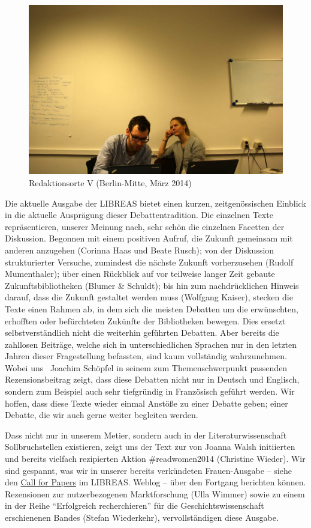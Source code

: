 \documentclass[a4paper,
fontsize=11pt,
oneside,
numbers=noperiodatend,
parskip=half-,
bibliography=totoc,
final
]{scrartcl}
\begin{document}
\begin{figure}[htbp]
\centering
\includegraphics{ediPic.jpg}
\caption{Redaktionsorte V (Berlin-Mitte, März 2014)}
\end{figure}

Die aktuelle Ausgabe der LIBREAS bietet einen kurzen, zeitgenössischen
Einblick in die aktuelle Ausprägung dieser Debattentradition. Die
einzelnen Texte repräsentieren, unserer Meinung nach, sehr schön die
einzelnen Facetten der Diskussion. Begonnen mit einem positiven Aufruf,
die Zukunft gemeinsam mit anderen anzugehen (Corinna Haas und Beate
Rusch); von der Diskussion strukturierter Versuche, zumindest die
nächste Zukunft vorherzusehen (Rudolf Mumenthaler); über einen Rückblick
auf vor teilweise langer Zeit gebaute Zukunftsbibliotheken (Blumer \&
Schuldt); bis hin zum nachdrücklichen Hinweis darauf, dass die Zukunft
gestaltet werden muss (Wolfgang Kaiser), stecken die Texte einen Rahmen
ab, in dem sich die meisten Debatten um die erwünschten, erhofften oder
befürchteten Zukünfte der Bibliotheken bewegen. Dies ersetzt
selbstverständlich nicht die weiterhin geführten Debatten. Aber bereits
die zahllosen Beiträge, welche sich in unterschiedlichen Sprachen nur in
den letzten Jahren dieser Fragestellung befassten, sind kaum vollständig
wahrzunehmen. Wobei uns~ Joachim Schöpfel in seinem zum
Themenschwerpunkt passenden Rezensionsbeitrag zeigt, dass diese Debatten
nicht nur in Deutsch und Englisch, sondern zum Beispiel auch sehr
tiefgründig in Französisch geführt werden. Wir hoffen, dass diese Texte
wieder einmal Anstöße zu einer Debatte geben; einer Debatte, die wir
auch gerne weiter begleiten werden.

Dass nicht nur in unserem Metier, sondern auch in der
Literaturwissenschaft Sollbruchstellen existieren, zeigt uns der Text
zur von Joanna Walsh initiierten und bereits vielfach rezipierten Aktion
\#readwomen2014 (Christine Wieder). Wir sind gespannt, was wir in
unserer bereits verkündeten Frauen-Ausgabe -- siehe den
\href{http://libreas.wordpress.com/2013/11/18/4384/}{Call for Papers} im
LIBREAS. Weblog -- über den Fortgang berichten können. Rezensionen zur
nutzerbezogenen Marktforschung (Ulla Wimmer) sowie zu einem in der Reihe
\enquote{Erfolgreich recherchieren} für die Geschichtswissenschaft
erschienenen Bandes (Stefan Wiederkehr), vervollständigen diese Ausgabe.
\end{document}
